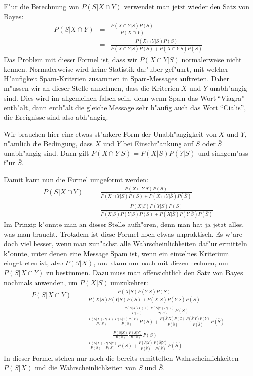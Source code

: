 F"ur die Berechnung von $P(S|X\cap Y)$ verwendet man jetzt wieder
den Satz von Bayes:
\begin{eqnarray}
P(S|X\cap Y)&=&\frac{P(X\cap Y|S)P(S)}{P(X\cap Y)}\nonumber\\
&=&\frac{P(X\cap Y|S)P(S)}{P(X\cap Y|S)P(S)+P(X\cap Y|\bar S)P(\bar S)}
\end{eqnarray}
Das Problem mit dieser Formel ist, dass wir $P(X\cap Y|S)$ normalerweise
nicht kennen. Normalerweise wird keine Statistik dar"uber gef"uhrt, mit
welcher H"aufigkeit Spam-Kriterien zusammen in Spam-Messages auftreten.
Daher m"ussen wir an dieser Stelle annehmen, dass die Kriterien $X$ und $Y$
unabh"angig sind. Dies wird im allgemeinen falsch sein, denn wenn Spam
das Wort ``Viagra'' enth"alt, dann enth"alt die gleiche Message sehr h"aufig
auch das Wort ``Cialis'', die Ereignisse sind also abh"angig.

Wir brauchen hier eine etwas st"arkere Form der Unabh"angigkeit von $X$ und $Y$,
n"amlich die Bedingung, dass $X$ und $Y$ bei Einschr"ankung auf $S$
oder $\bar S$ unabh"angig sind. Dann gilt $P(X\cap Y|S)=P(X|S)P(Y|S)$
und sinngem"ass f"ur $\bar S$.

Damit kann nun die Formel umgeformt werden:
\begin{eqnarray}
P(S|X\cap Y)&=&\frac{P(X\cap Y|S)P(S)}{P(X\cap Y|S)P(S)+P(X\cap Y|\bar S)P(\bar S)}\nonumber\\
&=&\frac{P(X|S)P(Y|S)P(S)}{P(X|S)P(Y|S)P(S)+P(X|\bar S)P(Y|\bar S)P(\bar S)}
\end{eqnarray}
Im Prinzip k"onnte man an dieser Stelle aufh"oren, denn man hat ja jetzt
alles, was man braucht. Trotzdem ist diese Formel noch etwas unpraktisch.
Es w"are doch viel besser, wenn man zun"achst alle Wahrscheinlichkeiten
daf"ur ermitteln k"onnte, unter denen eine Message Spam ist, wenn ein
einzelnes Kriterium eingetreten ist, also $P(S|X)$, und dann nur noch
mit diesen rechnen, um $P(S|X\cap Y)$ zu bestimmen.
Dazu muss man offensichtlich den Satz von Bayes nochmals anwenden, um
$P(X|S)$ umzukehren:
\begin{eqnarray}
P(S|X\cap Y)&=&\frac{P(X|S)P(Y|S)P(S)}{P(X|S)P(Y|S)P(S)+P(X|\bar S)P(Y|\bar S)P(\bar S)}\nonumber\\
&=&\frac{
\frac{P(S|X)P(X)}{P(S)}
\frac{P(S|Y)P(Y)}{P(S)}P(S)
}{
\frac{P(S|X)P(X)}{P(S)}
\frac{P(S|Y)P(Y)}{P(S)}P(S)
+
\frac{P(\bar S|X)P(X)}{P(\bar S)}
\frac{P(\bar S|Y)P(Y)}{P(\bar S)}P(\bar S)
}\nonumber\\
&=&\frac{
\frac{P(S|X)}{P(S)}
\frac{P(S|Y)}{P(S)}P(S)
}{
\frac{P(S|X)}{P(S)}
\frac{P(S|Y)}{P(S)}P(S)
+
\frac{P(\bar S|X)}{P(\bar S)}
\frac{P(\bar S|Y)}{P(\bar S)}P(\bar S)
}
\end{eqnarray}
In dieser Formel stehen nur noch die bereits ermittelten Wahrscheinlichkeiten
$P(S|X)$ und die Wahrscheinlichkeiten von $S$ und $\bar S$.

